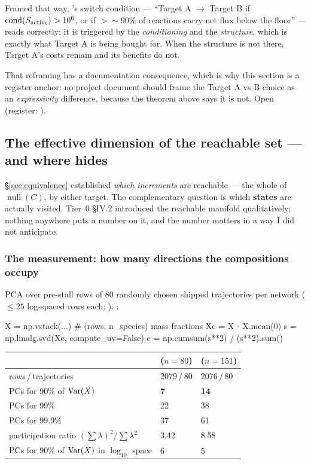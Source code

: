 Framed that way, 's switch condition --- ``Target A $\to$ Target
B if $\operatorname{cond}(S_{\mathrm{active}}) > 10^{6}$, or if $>{\sim}90\%$ of reactions carry net flux
below the \Ye{} floor'' --- reads correctly: it is triggered by the
\emph{conditioning} and the \emph{structure}, which is exactly what Target A is
being bought for. When the structure is not there, Target A's costs remain and
its benefits do not.

That reframing has a documentation consequence, which is why this section is a
register anchor: no project document should frame the Target A vs B choice as an
\emph{expressivity} difference, because the theorem above says it is not. Open
(register: ).

\subsection{The effective dimension of the reachable set --- and where
            \texorpdfstring{\Ye}{Ye} hides}
\label{sec:effdim}

\S\ref{sec:equivalence} established \emph{which increments} are reachable --- the
whole of $\operatorname{null}(C)$, by either target. The complementary question
is which \textbf{states} are actually visited. Tier~0 \S IV.2 introduced the
reachable manifold qualitatively; nothing anywhere puts a number on it, and the
number matters in a way I did not anticipate.

\subsubsection{The measurement: how many directions the compositions occupy}
\label{sec:effdim-measurement}

PCA over pre-stall rows of 80 randomly chosen shipped trajectories per network
($\le 25$ log-spaced rows each;
). \derivedhere:

\begin{srclisting}
X = np.vstack(...)                     # (rows, n_species) mass fractions
Xc = X - X.mean(0)
s = np.linalg.svd(Xc, compute_uv=False)
c = np.cumsum(s**2) / (s**2).sum()
\end{srclisting}

\begin{center}
\begin{tabularx}{\textwidth}{@{}Y L{3.2cm} L{3.2cm}@{}}
\toprule
 & \textbf{} ($n = 80$) & \textbf{} ($n = 151$) \\
\midrule
rows\,/\,trajectories & 2079\,/\,80 & 2076\,/\,80 \\
PCs for 90\% of $\operatorname*{Var}(X)$ & \textbf{7} & \textbf{14} \\
PCs for 99\% & 22 & 38 \\
PCs for 99.9\% & 37 & 61 \\
participation ratio $(\sum\lambda)^2/\sum\lambda^2$ & 3.42 & 8.58 \\
PCs for 90\% of $\operatorname*{Var}(X)$ in \textbf{$\log_{10}$} space & 6 & 5 \\
\bottomrule
\end{tabularx}
\end{center}

